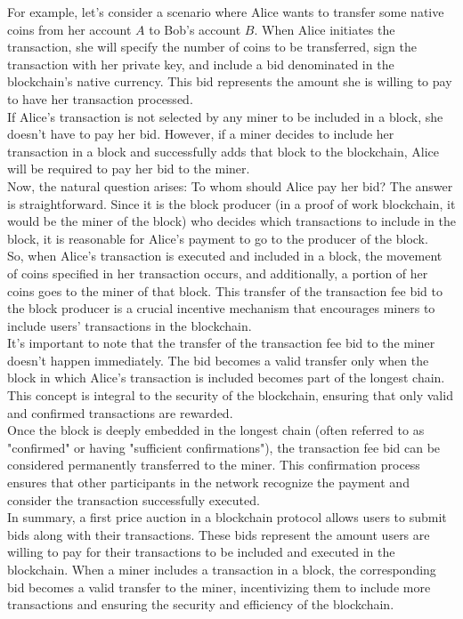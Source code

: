 For example, let's consider a scenario where Alice wants to transfer some native coins from her account $A$ to Bob's account $B$. When Alice initiates the transaction, she will specify the number of coins to be transferred, sign the transaction with her private key, and include a bid denominated in the blockchain's native currency. This bid represents the amount she is willing to pay to have her transaction processed.\\
If Alice's transaction is not selected by any miner to be included in a block, she doesn't have to pay her bid. However, if a miner decides to include her transaction in a block and successfully adds that block to the blockchain, Alice will be required to pay her bid to the miner.\\
Now, the natural question arises: To whom should Alice pay her bid? The answer is straightforward. Since it is the block producer (in a proof of work blockchain, it would be the miner of the block) who decides which transactions to include in the block, it is reasonable for Alice's payment to go to the producer of the block.\\
So, when Alice's transaction is executed and included in a block, the movement of coins specified in her transaction occurs, and additionally, a portion of her coins goes to the miner of that block. This transfer of the transaction fee bid to the block producer is a crucial incentive mechanism that encourages miners to include users' transactions in the blockchain.\\
It's important to note that the transfer of the transaction fee bid to the miner doesn't happen immediately. The bid becomes a valid transfer only when the block in which Alice's transaction is included becomes part of the longest chain. This concept is integral to the security of the blockchain, ensuring that only valid and confirmed transactions are rewarded.\\
Once the block is deeply embedded in the longest chain (often referred to as "confirmed" or having "sufficient confirmations"), the transaction fee bid can be considered permanently transferred to the miner. This confirmation process ensures that other participants in the network recognize the payment and consider the transaction successfully executed.\\

In summary, a first price auction in a blockchain protocol allows users to submit bids along with their transactions. These bids represent the amount users are willing to pay for their transactions to be included and executed in the blockchain. When a miner includes a transaction in a block, the corresponding bid becomes a valid transfer to the miner, incentivizing them to include more transactions and ensuring the security and efficiency of the blockchain.


